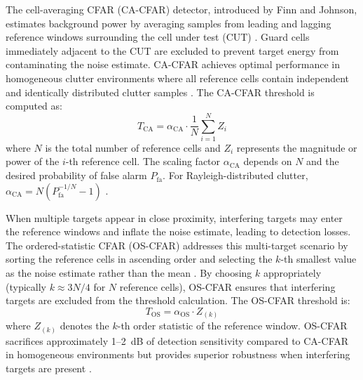 The cell-averaging CFAR (CA-CFAR) detector, introduced by Finn and Johnson, estimates background power by averaging samples from leading and lagging reference windows surrounding the cell under test (CUT) \cite{Finn1968}. Guard cells immediately adjacent to the CUT are excluded to prevent target energy from contaminating the noise estimate. CA-CFAR achieves optimal performance in homogeneous clutter environments where all reference cells contain independent and identically distributed clutter samples \cite{Gandhi1988}. The CA-CFAR threshold is computed as:
\begin{equation}
T_{\text{CA}} = \alpha_{\text{CA}} \cdot \frac{1}{N} \sum_{i=1}^{N} Z_i
\end{equation}
where $N$ is the total number of reference cells and $Z_i$ represents the magnitude or power of the $i$-th reference cell. The scaling factor $\alpha_{\text{CA}}$ depends on $N$ and the desired probability of false alarm $P_{\text{fa}}$. For Rayleigh-distributed clutter, $\alpha_{\text{CA}} = N \left( P_{\text{fa}}^{-1/N} - 1 \right)$ \cite{Richards2022}.

When multiple targets appear in close proximity, interfering targets may enter the reference windows and inflate the noise estimate, leading to detection losses. The ordered-statistic CFAR (OS-CFAR) addresses this multi-target scenario by sorting the reference cells in ascending order and selecting the $k$-th smallest value as the noise estimate rather than the mean \cite{Rohling1983}. By choosing $k$ appropriately (typically $k \approx 3N/4$ for $N$ reference cells), OS-CFAR ensures that interfering targets are excluded from the threshold calculation. The OS-CFAR threshold is:
\begin{equation}
T_{\text{OS}} = \alpha_{\text{OS}} \cdot Z_{(k)}
\end{equation}
where $Z_{(k)}$ denotes the $k$-th order statistic of the reference window. OS-CFAR sacrifices approximately 1--2~dB of detection sensitivity compared to CA-CFAR in homogeneous environments but provides superior robustness when interfering targets are present \cite{Gandhi1988}.

